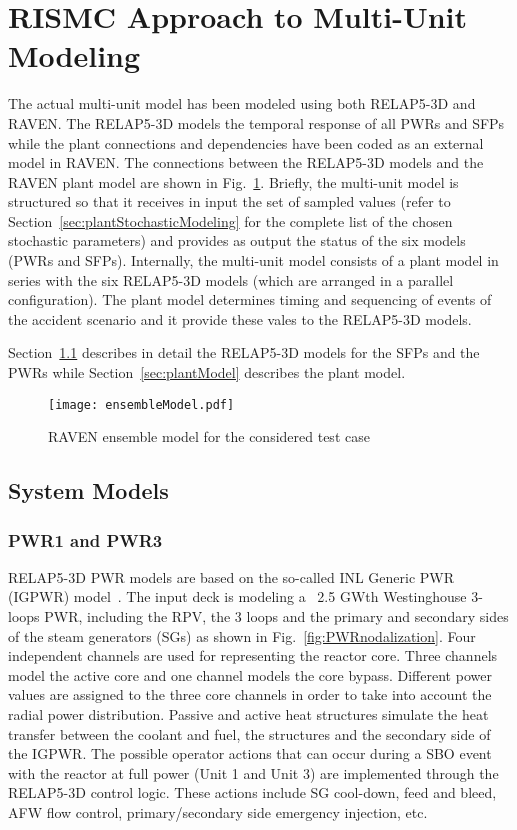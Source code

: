 \section{RISMC Approach to Multi-Unit Modeling}
\label{sec:RISMC_MU_modeling}

The actual multi-unit model has been modeled using both RELAP5-3D and RAVEN.
The RELAP5-3D models the temporal response of all PWRs and SFPs while the plant 
connections and dependencies have been coded as an external model in RAVEN.
The connections between the RELAP5-3D models and the RAVEN plant model are 
shown in Fig.~\ref{fig:ensembleModel}.
Briefly, the multi-unit model is structured so that it receives in input the set of 
sampled values (refer to Section~\ref{sec:plantStochasticModeling} for the complete list of 
the chosen stochastic parameters) and provides as output the status of the six
models (PWRs and SFPs).
Internally, the multi-unit model consists of a plant model in series with the six 
RELAP5-3D models (which are arranged in a parallel configuration).
The plant model determines timing and sequencing of events of the accident scenario
and it provide these vales to the RELAP5-3D models.

Section~\ref{sec:systemModels} describes in detail the RELAP5-3D models for 
the SFPs and the PWRs while Section~\ref{sec:plantModel} describes the plant 
model.
 
\begin{figure}
    \centering
    \texttt{[image: ensembleModel.pdf]}
    \caption{RAVEN ensemble model for the considered test case}
    \label{fig:ensembleModel}
\end{figure}

\subsection{System Models}
\label{sec:systemModels}

\subsubsection{PWR1 and PWR3}
RELAP5-3D PWR models are based on the so-called INL Generic PWR (IGPWR) 
model~\cite{parisiExternalHazard,ronaldoRISMC}. 
The input deck is modeling a ~2.5 GWth Westinghouse 3-loops PWR, including the RPV,
the 3 loops and the primary and secondary sides of the steam 
generators (SGs) as shown in Fig.~\ref{fig:PWRnodalization}.
Four independent channels are used for representing the reactor core. Three channels model 
the active core and one channel models the core bypass. Different power values are assigned 
to the three core channels in order to take into account the radial power distribution. 
Passive and active heat structures simulate the heat transfer between the coolant and fuel, 
the structures and the secondary side of the IGPWR.
The possible operator actions that can occur during a SBO event with 
the reactor at full power (Unit 1 and Unit 3) are implemented through the RELAP5-3D control 
logic. These actions include SG cool-down, feed and bleed, AFW flow control, primary/secondary 
side emergency injection, etc.

